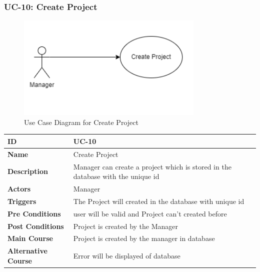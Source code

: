 \subsubsection{UC-10: Create Project}
\begin{figure}[H]
    \includegraphics[height=5cm, width=0.8\textwidth]{./diagrams/Use Case/u10.png}
    \centering
    \caption{Use Case Diagram for Create Project}
    \label{fig:Usecase1}
\end{figure}

\begin{center}
    \begin{tabularx}{\textwidth}{|l|X|}
        \hline
        \textbf{ID}                 & UC-10                                                                           \\
        \hline
        \textbf{Name}               & Create Project                                                                  \\
        \hline
        \textbf{Description}        & Manager can create a project which is stored in the database with the unique id \\
        \hline
        \textbf{Actors}             & Manager                                                                         \\
        \hline
        \textbf{Triggers}           & The Project will created in the database with unique id                         \\
        \hline
        \textbf{Pre Conditions}     & user will be valid and Project can't created before                             \\
        \hline
        \textbf{Post Conditions}    & Project is created by the Manager                                               \\
        \hline
        \textbf{Main Course}        & Project is created by the manager in database                                   \\
        \hline
        \textbf{Alternative Course} & Error will be displayed of database                                             \\
        \hline
    \end{tabularx}
\end{center}

